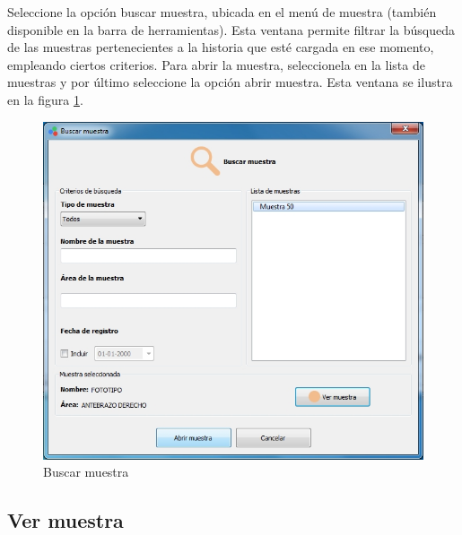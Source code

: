 		Seleccione la opci\'{o}n buscar muestra, ubicada en el men\'{u} de muestra (tambi\'{e}n disponible en la barra de herramientas). Esta ventana permite filtrar la b\'{u}squeda de las muestras pertenecientes a la historia que est\'{e} cargada en ese momento, empleando ciertos criterios. Para abrir la muestra, seleccionela en la lista de muestras y por \'{u}ltimo seleccione la opci\'{o}n abrir muestra. Esta ventana se ilustra en la figura \ref{fig:buscar-muestra}.
\vfill
\begin{figure}[H]
  \centering
  \includegraphics[width=.9\linewidth]{./img/buscar-muestra.jpg}
\caption[]{Buscar muestra\label{fig:buscar-muestra}}
\end{figure}
\vfill
\newpage
	\subsection*{Ver muestra}
	
